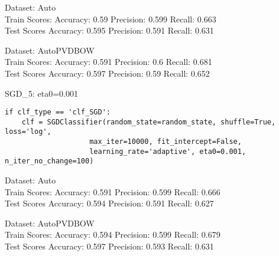\documentclass[11pt,preprint, authoryear]{elsarticle}
\numberwithin{equation}{section}
\numberwithin{figure}{section}
\numberwithin{table}{section}
\begin{document}
Dataset: Auto\\
Train Scores: Accuracy: 0.59 Precision: 0.599 Recall: 0.663\\
Test Scores Accuracy: 0.595 Precision: 0.591 Recall: 0.631

Dataset: AutoPVDBOW\\
Train Scores: Accuracy: 0.591 Precision: 0.6 Recall: 0.681\\
Test Scores Accuracy: 0.597 Precision: 0.59 Recall: 0.652

SGD\_5: eta0=0.001

\begin{verbatim}
if clf_type == 'clf_SGD':
    clf = SGDClassifier(random_state=random_state, shuffle=True, loss='log', 
                    max_iter=10000, fit_intercept=False,
                    learning_rate='adaptive', eta0=0.001, n_iter_no_change=100)
\end{verbatim}

Dataset: Auto\\
Train Scores: Accuracy: 0.591 Precision: 0.599 Recall: 0.666\\
Test Scores Accuracy: 0.594 Precision: 0.591 Recall: 0.627

Dataset: AutoPVDBOW\\
Train Scores: Accuracy: 0.594 Precision: 0.599 Recall: 0.679\\
Test Scores Accuracy: 0.597 Precision: 0.593 Recall: 0.631


\end{document}

